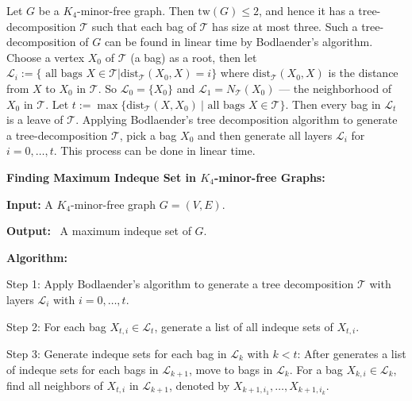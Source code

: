 \documentclass{article}
\begin{document}
Let $G$ be a $K_4$-minor-free graph. Then $\text{tw}(G)\le 2$, and hence it has a tree-decomposition $\mathcal T$ such that each bag of $\mathcal T$ has size at most three. Such a tree-decomposition of $G$ can be found in linear time by Bodlaender's algorithm. Choose a vertex $X_0$ of $\mathcal T$ (a bag) as a root, then let $\mathcal L_i:=\{\text{ all bags }X \in \mathcal T | \text{dist}_{\mathcal T} (X_0, X)=i\}$ where $\text{dist}_{\mathcal T}(X_0,X)$ is the distance from $X$ to $X_0$ in $\mathcal T$. So $\mathcal L_0=\{X_0\}$ and $\mathcal L_1=N_{\mathcal T}(X_0)$ --- the neighborhood of $X_0$ in $\mathcal T$.  Let $t:=\max \{\text{dist}_{\mathcal T}(X, X_0) \ | \text{ all bags } X\in \mathcal T\}$. Then every bag in $\mathcal L_t$ is a leave of $\mathcal T$. Applying Bodlaender's tree decomposition algorithm to generate a tree-decomposition $\mathcal T$, pick a bag $X_0$ and then generate all layers $\mathcal L_i$ for $i=0, \ldots, t$. This process can be done in linear time. 



\medskip
{\bf Finding Maximum Indeque Set in $K_4$-minor-free Graphs:}  \medskip

{\bf Input:}  \hspace{.25cm}  A $K_4$-minor-free graph $G=(V,E)$.

{\bf Output:} \ A maximum indeque set of $G$. \medskip

{\bf Algorithm:}  

Step 1: Apply Bodlaender's algorithm to generate a tree decomposition $\mathcal T$ with layers $\mathcal L_i$ with $i=0,\ldots, t$. 

Step 2: For each bag $X_{t,i}\in \mathcal L_t$, generate a list of all indeque sets of $X_{t,i}$. 


Step 3: Generate indeque sets for each bag in $\mathcal L_k$ with $k< t$: After generates a list of indeque sets for each bags in $\mathcal L_{k+1}$, move to bags in $\mathcal L_k$. For a bag $X_{k,i}\in \mathcal L_k$, find all neighbors of $X_{t,i}$ in $\mathcal L_{k+1}$, denoted by $X_{k+1, i_1},\ldots, X_{k+1, i_k}$. 
\end{document}
